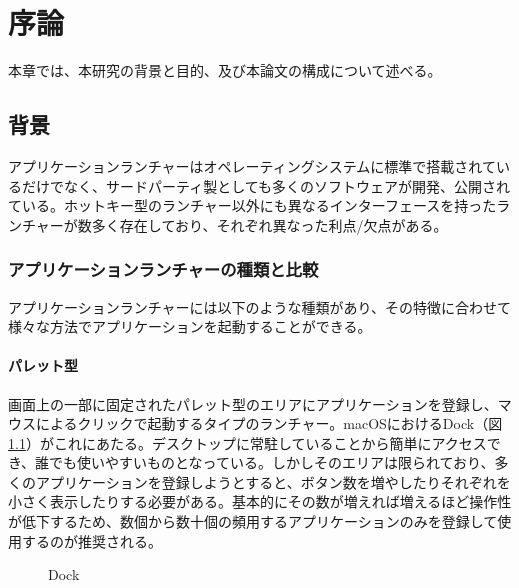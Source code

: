 \chapter{序論}
\label{chap:introduction}

本章では、本研究の背景と目的、及び本論文の構成について述べる。

\newpage

\section{背景}

アプリケーションランチャーはオペレーティングシステムに標準で搭載されているだけでなく、サードパーティ製としても多くのソフトウェアが開発、公開されている。ホットキー型のランチャー以外にも異なるインターフェースを持ったランチャーが数多く存在しており、それぞれ異なった利点/欠点がある。

\subsection{アプリケーションランチャーの種類と比較}

アプリケーションランチャーには以下のような種類があり、その特徴に合わせて様々な方法でアプリケーションを起動することができる。

\subsubsection{パレット型}

画面上の一部に固定されたパレット型のエリアにアプリケーションを登録し、マウスによるクリックで起動するタイプのランチャー。macOSにおけるDock（図\ref{fig:dock}）がこれにあたる。デスクトップに常駐していることから簡単にアクセスでき、誰でも使いやすいものとなっている。しかしそのエリアは限られており、多くのアプリケーションを登録しようとすると、ボタン数を増やしたりそれぞれを小さく表示したりする必要がある。基本的にその数が増えれば増えるほど操作性が低下するため、数個から数十個の頻用するアプリケーションのみを登録して使用するのが推奨される。

\begin{figure}[h]
    \begin{center}
    \end{center}
    \caption{Dock}
    \label{fig:dock}
\end{figure}

